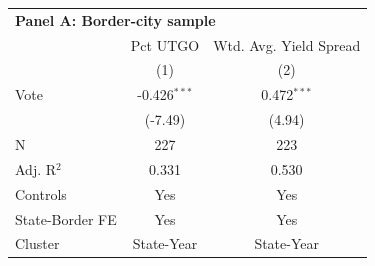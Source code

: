 \begingroup
\centering
\begin{tabular*}{\textwidth}{@{\extracolsep{\fill}}lcc}
\multicolumn{3}{l}{\textbf{Panel A: Border-city sample}}\\

\addlinespace
   \toprule
                   & Pct UTGO       & Wtd. Avg. Yield Spread\\  
                   & (1)            & (2)\\  
   \midrule 
   Vote            & -0.426$^{***}$ & 0.472$^{***}$\\
                   & (-7.49)       & (4.94)\\
   \hline
   N    & 227            & 223\\  
   Adj. R$^2$  & 0.331          & 0.530\\
   Controls                   & Yes            & Yes\\
   State-Border FE & Yes            & Yes\\  
   Cluster              & State-Year & State-Year\\  
   \bottomrule
\end{tabular*}
\par\endgroup
